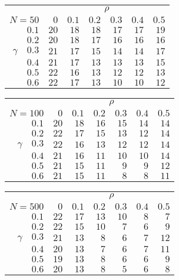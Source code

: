 \begin{tabular}{r|rrrrrr}
\hline\hline
 &\multicolumn{6}{c}{$\rho$} \\ 
 $N = 50$ & $0$ & $0.1$ & $0.2$ & $0.3$ & $0.4$ & $0.5$ \\ 
 \hline$0.1$ & $20$ & $18$ & $18$ & $17$ & $17$ & $19$\\ 
$0.2$ & $20$ & $18$ & $17$ & $16$ & $16$ & $16$\\ 
$\gamma\quad$$0.3$ & $21$ & $17$ & $15$ & $14$ & $14$ & $17$\\ 
$0.4$ & $21$ & $17$ & $13$ & $13$ & $13$ & $15$\\ 
$0.5$ & $22$ & $16$ & $13$ & $12$ & $12$ & $13$\\ 
$0.6$ & $22$ & $17$ & $13$ & $10$ & $10$ & $12$\\ 
 \hline 
 \end{tabular}
 
 \vspace{2em} 
 
\begin{tabular}{r|rrrrrr}
\hline\hline
 &\multicolumn{6}{c}{$\rho$} \\ 
 $N = 100$ & $0$ & $0.1$ & $0.2$ & $0.3$ & $0.4$ & $0.5$ \\ 
 \hline$0.1$ & $20$ & $18$ & $16$ & $15$ & $14$ & $14$\\ 
$0.2$ & $22$ & $17$ & $15$ & $13$ & $12$ & $14$\\ 
$\gamma\quad$$0.3$ & $22$ & $16$ & $13$ & $12$ & $12$ & $14$\\ 
$0.4$ & $21$ & $16$ & $11$ & $10$ & $10$ & $14$\\ 
$0.5$ & $21$ & $15$ & $11$ & $9$ & $9$ & $12$\\ 
$0.6$ & $21$ & $15$ & $11$ & $8$ & $8$ & $11$\\ 
 \hline 
 \end{tabular}
 
 \vspace{2em} 
 
\begin{tabular}{r|rrrrrr}
\hline\hline
 &\multicolumn{6}{c}{$\rho$} \\ 
 $N = 500$ & $0$ & $0.1$ & $0.2$ & $0.3$ & $0.4$ & $0.5$ \\ 
 \hline$0.1$ & $22$ & $17$ & $13$ & $10$ & $8$ & $7$\\ 
$0.2$ & $22$ & $15$ & $10$ & $7$ & $6$ & $9$\\ 
$\gamma\quad$$0.3$ & $21$ & $13$ & $8$ & $6$ & $7$ & $12$\\ 
$0.4$ & $20$ & $13$ & $7$ & $6$ & $7$ & $11$\\ 
$0.5$ & $19$ & $13$ & $8$ & $6$ & $6$ & $9$\\ 
$0.6$ & $20$ & $13$ & $8$ & $5$ & $6$ & $8$\\ 
 \hline 
 \end{tabular}